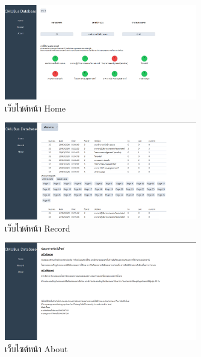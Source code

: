   \begin{figure}[h!]
    \begin{center}
      \includegraphics[width=0.75\textwidth]{home.png}
    \end{center}
    \caption[Poem]{เว็บไซต์หน้า Home}
    \label{fig:home}
  \end{figure}

  \begin{figure}[h!]
    \begin{center}
      \includegraphics[width=0.75\textwidth]{record.png}
    \end{center}
    \caption[Poem]{เว็บไซต์หน้า Record}
    \label{fig:record}
  \end{figure}

  \begin{figure}[h!]
    \begin{center}
      \includegraphics[width=0.75\textwidth]{about.png}
    \end{center}
    \caption[Poem]{เว็บไซต์หน้า About}
    \label{fig:about}
  \end{figure}